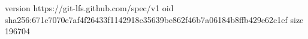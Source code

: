 version https://git-lfs.github.com/spec/v1
oid sha256:671c7070e7af4f26433f1142918c35639be862f46b7a06184b8ffb429e62c1ef
size 196704
